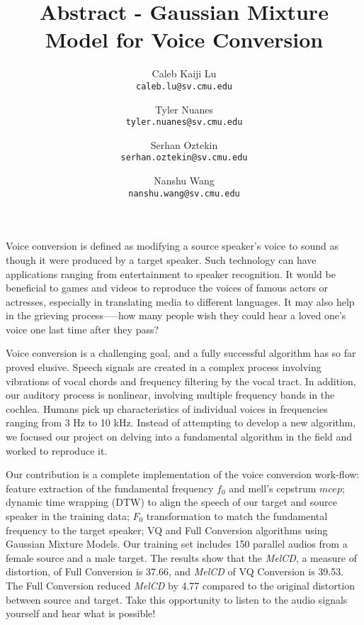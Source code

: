\documentclass[11pt]{article}
\title{Abstract - Gaussian Mixture Model for Voice Conversion}
\author{
	Caleb Kaiji Lu \\
	{\tt caleb.lu@sv.cmu.edu}
	\and
	Tyler Nuanes \\
	{\tt tyler.nuanes@sv.cmu.edu}
	\and
	Serhan Oztekin \\
	{\tt serhan.oztekin@sv.cmu.edu}
	\and
	Nanshu Wang \\
	{\tt nanshu.wang@sv.cmu.edu}
}
\date{}
\begin{document}
\maketitle
Voice conversion is defined as modifying a source speaker’s voice to sound as though it were produced by a target speaker. Such technology can have applications ranging from entertainment to speaker recognition. It would be beneficial to games and videos to reproduce the voices of famous actors or actresses, especially in translating media to different languages. It may also help in the grieving process—--how many people wish they could hear a loved one’s voice one last time after they pass? 

Voice conversion is a challenging goal, and a fully successful algorithm has so far proved elusive. Speech signals are created in a complex process involving vibrations of vocal chords and frequency filtering by the vocal tract. In addition, our auditory process is nonlinear, involving multiple frequency bands in the cochlea. Humans pick up characteristics of individual voices in frequencies ranging from 3 Hz to 10 kHz. Instead of attempting to develop a new algorithm, we focused our project on delving into a fundamental algorithm in the field and worked to reproduce it. 

Our contribution is a complete implementation of the voice conversion work-flow: feature extraction of the fundamental frequency $f_0$ and mell's cepstrum $mcep$; dynamic time wrapping (DTW) to align the speech of our target and source speaker in the training data; $F_0$ transformation to match the fundamental frequency to the target speaker; VQ and Full Conversion algorithms using Gaussian Mixture Models. Our training set includes 150 parallel audios from a female source and a male target. The results show that the \textit{MelCD}, a measure of distortion, of Full Conversion is 37.66,  and \textit{MelCD} of VQ Conversion is 39.53. The Full Conversion reduced  \textit{MelCD} by 4.77 compared to the original distortion between source and target. Take this opportunity to listen to the audio signals yourself and hear what is possible!
\end{document}
